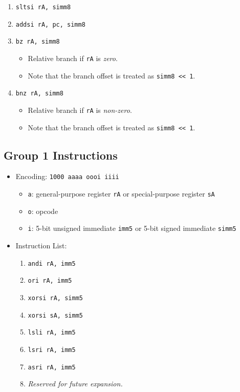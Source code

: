 \documentclass{article}
\begin{document}
\begin{itemize}
\begin{enumerate}
			\item \texttt{sltsi rA, simm8}
			\item \texttt{addsi rA, pc, simm8}

			\item \texttt{bz rA, simm8}
				\begin{itemize}
				\item Relative branch if \texttt{rA} is \textit{zero}.
				\item Note that the branch offset is treated as
					\texttt{simm8 << 1}.
				\end{itemize}
			\item \texttt{bnz rA, simm8}
				\begin{itemize}
				\item Relative branch if \texttt{rA} is \textit{non-zero}.
				\item Note that the branch offset is treated as
					\texttt{simm8 << 1}.
				\end{itemize}
			\end{enumerate}
		\end{itemize}

	\subsection{Group 1 Instructions}
		\begin{itemize}
		\item Encoding:  \texttt{1000 aaaa oooi iiii}
			\begin{itemize}
			\item \texttt{a}:  general-purpose register \texttt{rA} or
				special-purpose register \texttt{sA}
			\item \texttt{o}:  opcode
			\item \texttt{i}:  5-bit unsigned immediate \texttt{imm5} or
				5-bit signed immediate \texttt{simm5}
			\end{itemize}
		\item Instruction List:
			\begin{enumerate}
			\item \texttt{andi rA, imm5}
			\item \texttt{ori rA, imm5}
			\item \texttt{xorsi rA, simm5}
			\item \texttt{xorsi sA, simm5}

			\item \texttt{lsli rA, imm5}
			\item \texttt{lsri rA, imm5}
			\item \texttt{asri rA, imm5}
			\item \textit{Reserved for future expansion.}
			\end{enumerate}
		\end{itemize}
\end{document}
